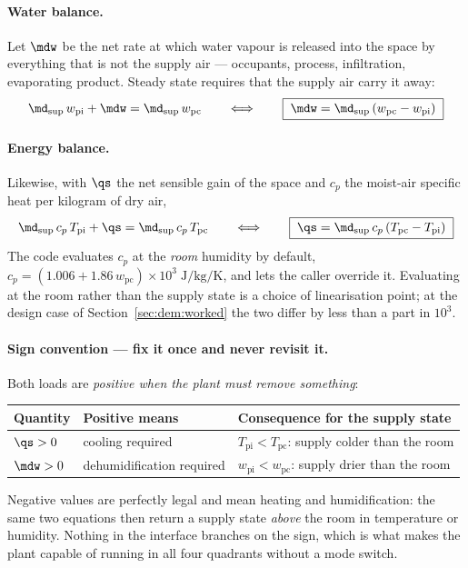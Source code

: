 \paragraph{Water balance.} Let $\mdw$ be the net rate at which water vapour is
released into the space by everything that is not the supply air --- occupants,
process, infiltration, evaporating product. Steady state requires that the supply
air carry it away:
\begin{equation}
\md_{\mathrm{sup}}\,w_{\mathrm{pi}}+\mdw=\md_{\mathrm{sup}}\,w_{\mathrm{pc}}
\qquad\Longleftrightarrow\qquad
\boxed{\;\mdw=\md_{\mathrm{sup}}\left(w_{\mathrm{pc}}-w_{\mathrm{pi}}\right)\;}
\label{eq:dem:water}
\end{equation}

\paragraph{Energy balance.} Likewise, with $\qs$ the net sensible gain of the
space and $c_p$ the moist-air specific heat per kilogram of dry air,
\begin{equation}
\md_{\mathrm{sup}}\,c_p\,T_{\mathrm{pi}}+\qs=\md_{\mathrm{sup}}\,c_p\,T_{\mathrm{pc}}
\qquad\Longleftrightarrow\qquad
\boxed{\;\qs=\md_{\mathrm{sup}}\,c_p\left(T_{\mathrm{pc}}-T_{\mathrm{pi}}\right)\;}
\label{eq:dem:sens}
\end{equation}
The code evaluates $c_p$ at the \emph{room} humidity by default,
$c_p=(1.006+1.86\,w_{\mathrm{pc}})\times10^{3}\;\si{\joule\per\kilogram\per\kelvin}$,
and lets the caller override it. Evaluating at the room rather than the supply
state is a choice of linearisation point; at the design case of
Section~\ref{sec:dem:worked} the two differ by less than a part in $10^{3}$.

\paragraph{Sign convention --- fix it once and never revisit it.}
Both loads are \emph{positive when the plant must remove something}:
\begin{center}
\begin{tabular}{@{}lll@{}}
\toprule
Quantity & Positive means & Consequence for the supply state \\
\midrule
$\qs>0$   & cooling required        & $T_{\mathrm{pi}}<T_{\mathrm{pc}}$: supply colder than the room \\
$\mdw>0$  & dehumidification required & $w_{\mathrm{pi}}<w_{\mathrm{pc}}$: supply drier than the room \\
\bottomrule
\end{tabular}
\end{center}
Negative values are perfectly legal and mean heating and humidification: the
same two equations then return a supply state \emph{above} the room in
temperature or humidity. Nothing in the interface branches on the sign, which is
what makes the plant capable of running in all four quadrants without a mode
switch.

